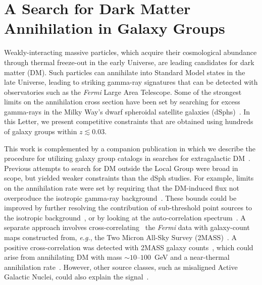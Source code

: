 \chapter{A Search for Dark Matter Annihilation in Galaxy Groups}

  Weakly-interacting massive particles, which acquire their cosmological abundance through thermal freeze-out in the early Universe, are leading candidates for dark matter (DM).  Such particles can annihilate into Standard Model states in the late Universe, leading to striking gamma-ray signatures that can be detected with observatories such as the {\it Fermi} Large Area Telescope.  
Some of the strongest limits on the annihilation cross section have been set by searching for excess gamma-rays in the Milky Way's dwarf spheroidal satellite galaxies (dSphs)~\cite{Ackermann:2015zua,Fermi-LAT:2016uux}.  In this Letter, we present competitive constraints that are obtained using hundreds of galaxy groups within $z\lesssim0.03$. 

This work is complemented by a companion publication in which we describe the procedure for utilizing  galaxy group catalogs in searches for extragalactic DM~\cite{companion}.  Previous attempts to search for DM outside the Local Group were broad in scope, but yielded weaker constraints than the dSph studies.  For example, limits on the annihilation rate were set by requiring that the DM-induced flux not overproduce the isotropic gamma-ray background~\cite{Ackermann:2015tah}.  These bounds could be improved by further resolving the contribution of sub-threshold point sources to the isotropic background~\cite{Zechlin:2016pme,Lisanti:2016jub}, or by  
looking at the auto-correlation spectrum~\cite{Ackermann:2012uf, Ackermann:2012uf,Ando:2006cr,Ando:2013ff}.  A separate approach involves cross-correlating~\cite{Xia:2011ax,Ando:2014aoa,Ando:2013xwa,Xia:2015wka,Regis:2015zka,Cuoco:2015rfa,Ando:2016ang} the {\it Fermi} data with galaxy-count maps constructed from, \emph{e.g.}, the Two Micron All-Sky Survey (2MASS)~\cite{Jarrett:2000me,Bilicki:2013sza}.  A positive cross-correlation was detected with 2MASS galaxy counts~\cite{Xia:2015wka}, which could arise from annihilating DM with mass $\sim$$10$--$100$~GeV and a near-thermal annihilation rate~\cite{Regis:2015zka}.  However, other source classes, such as misaligned Active Galactic Nuclei, could also explain the signal~\cite{Cuoco:2015rfa}.
  
